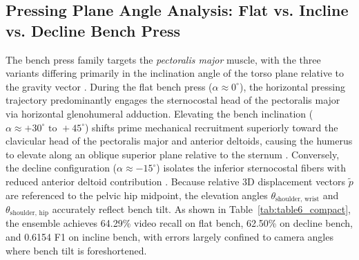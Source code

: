 \documentclass[runningheads]{llncs}
\begin{document}
\subsection{Pressing Plane Angle Analysis: Flat vs. Incline vs. Decline Bench Press}
The bench press family targets the \textit{pectoralis major} muscle, with the three variants differing primarily in the inclination angle of the torso plane relative to the gravity vector \cite{barnett1995,trebs2010}. During the flat bench press ($\alpha \approx 0^\circ$), the horizontal pressing trajectory predominantly engages the sternocostal head of the pectoralis major via horizontal glenohumeral adduction. Elevating the bench inclination ($\alpha \approx +30^\circ \text{ to } +45^\circ$) shifts prime mechanical recruitment superiorly toward the clavicular head of the pectoralis major and anterior deltoids, causing the humerus to elevate along an oblique superior plane relative to the sternum \cite{trebs2010}. Conversely, the decline configuration ($\alpha \approx -15^\circ$) isolates the inferior sternocostal fibers with reduced anterior deltoid contribution \cite{barnett1995}. Because relative 3D displacement vectors $\tilde{p}$ are referenced to the pelvic hip midpoint, the elevation angles $\theta_{\text{shoulder, wrist}}$ and $\theta_{\text{shoulder, hip}}$ accurately reflect bench tilt. As shown in Table~\ref{tab:table6_compact}, the ensemble achieves 64.29\% video recall on flat bench, 62.50\% on decline bench, and 0.6154 F1 on incline bench, with errors largely confined to camera angles where bench tilt is foreshortened.
\end{document}
